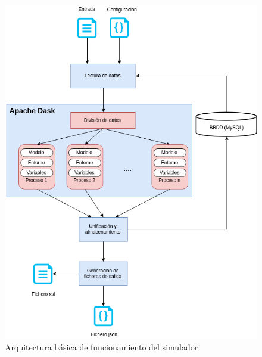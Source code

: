 \documentclass{article}
\begin{document}
\begin{figure}[h]
\label{fig:1}
\caption{Arquitectura básica de funcionamiento del simulador}
\centering
\includegraphics[scale=0.42]{./img/architecture.png}
\end{figure}
\end{document}
